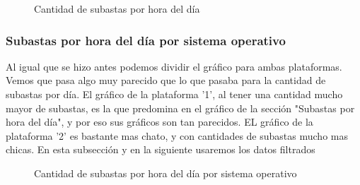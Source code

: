 \documentclass[a4paper, 12pt]{article}
\newcommand\tab[1][1cm]{\hspace*{#1}}
\begin{document}
	\FloatBarrier
		\begin{figure}
			\centering
		   	\caption{Cantidad de subastas por hora del día}
			\label{subastashora}
		\end{figure}
	\FloatBarrier
	\subsubsection{Subastas por hora del día por sistema operativo}
	\tab Al igual que se hizo antes podemos dividir el gráfico para ambas plataformas. Vemos que pasa algo muy parecido que lo que pasaba para la cantidad de subastas por día. El gráfico de la plataforma '1', al tener una cantidad mucho mayor de subastas, es la que predomina en el gráfico de la sección "Subastas por hora del día", y por eso sus gráficos son tan parecidos. EL gráfico de la plataforma '2' es bastante mas chato, y con cantidades de subastas mucho mas chicas.
	En esta subsección y en la siguiente usaremos los datos filtrados
	\FloatBarrier
		\begin{figure}
			\centering
		   	\caption{Cantidad de subastas por hora del día por sistema operativo}
			\label{subastashoraSO}
		\end{figure}
	\FloatBarrier
\end{document}
